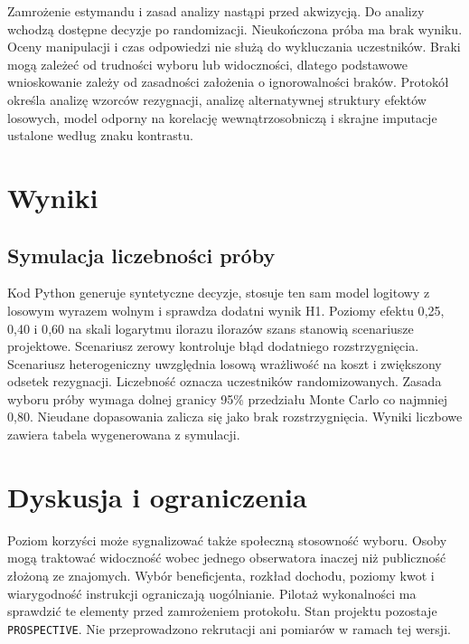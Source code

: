 \documentclass[11pt,a4paper]{article}
\begin{document}
Zamrożenie estymandu i zasad analizy nastąpi przed akwizycją. Do analizy wchodzą dostępne decyzje po randomizacji. Nieukończona próba ma brak wyniku. Oceny manipulacji i czas odpowiedzi nie służą do wykluczania uczestników. Braki mogą zależeć od trudności wyboru lub widoczności, dlatego podstawowe wnioskowanie zależy od zasadności założenia o ignorowalności braków. Protokół określa analizę wzorców rezygnacji, analizę alternatywnej struktury efektów losowych, model odporny na korelację wewnątrzosobniczą i skrajne imputacje ustalone według znaku kontrastu.

\section{Wyniki}
\subsection{Symulacja liczebności próby}
Kod Python generuje syntetyczne decyzje, stosuje ten sam model logitowy z losowym wyrazem wolnym i sprawdza dodatni wynik H1. Poziomy efektu 0{,}25, 0{,}40 i 0{,}60 na skali logarytmu ilorazu ilorazów szans stanowią scenariusze projektowe. Scenariusz zerowy kontroluje błąd dodatniego rozstrzygnięcia. Scenariusz heterogeniczny uwzględnia losową wrażliwość na koszt i zwiększony odsetek rezygnacji. Liczebność oznacza uczestników randomizowanych. Zasada wyboru próby wymaga dolnej granicy 95\% przedziału Monte Carlo co najmniej 0{,}80. Nieudane dopasowania zalicza się jako brak rozstrzygnięcia. Wyniki liczbowe zawiera tabela wygenerowana z symulacji.


\section{Dyskusja i ograniczenia}
Poziom korzyści może sygnalizować także społeczną stosowność wyboru. Osoby mogą traktować widoczność wobec jednego obserwatora inaczej niż publiczność złożoną ze znajomych. Wybór beneficjenta, rozkład dochodu, poziomy kwot i wiarygodność instrukcji ograniczają uogólnianie. Pilotaż wykonalności ma sprawdzić te elementy przed zamrożeniem protokołu. Stan projektu pozostaje \texttt{PROSPECTIVE}. Nie przeprowadzono rekrutacji ani pomiarów w ramach tej wersji.


\end{document}
